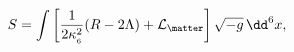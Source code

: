 \begin{equation}
\label{eq:action} S=\int\left[\frac{1}{2\kappa_{_6}^2}(R-2\Lambda)
+{\cal L}_{\matter}\right]\sqrt{-g}\,\dd^6 x,
\end{equation}


